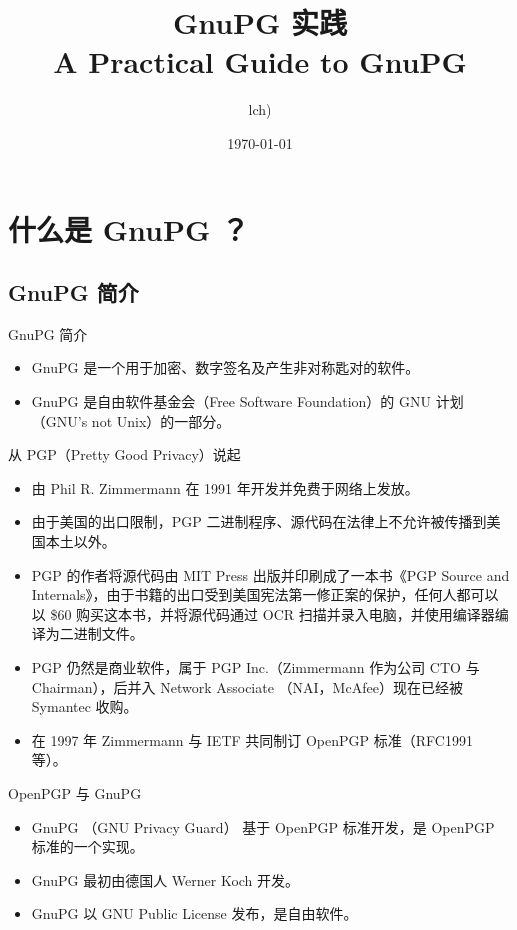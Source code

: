\documentclass{beamer}
\title{GnuPG 实践\\ A Practical Guide to GnuPG}
\author{lch)}
\date{\today}
\institute[LZUOSS]{
	\href{mailto:lchopn@gmail.com}{\textit{lchopn@gmail.com}}
}
\begin{document}
	\maketitle
	\section{什么是 GnuPG ？}
		\subsection{GnuPG 简介}
			\begin{frame}{GnuPG 简介}
				\begin{itemize}
					\item GnuPG 是一个用于加密、数字签名及产生非对称匙对的软件。
					\item GnuPG 是自由软件基金会（Free Software Foundation）的 GNU 计划 （GNU's not Unix）的一部分。
				\end{itemize}
			\end{frame}
			\begin{frame}{从 PGP（Pretty Good Privacy）说起}
			\begin{itemize}[<+->]
				\item 由 Phil R. Zimmermann 在 1991 年开发并免费于网络上发放。
				\item 由于美国的出口限制，PGP 二进制程序、源代码在法律上不允许被传播到美国本土以外。
				\item PGP 的作者将源代码由 MIT Press 出版并印刷成了一本书《PGP Source and Internals》，由于书籍的出口受到美国宪法第一修正案的保护，任何人都可以以 \$60 购买这本书，并将源代码通过 OCR 扫描并录入电脑，并使用编译器编译为二进制文件。
				\item PGP 仍然是商业软件，属于 PGP Inc.（Zimmermann 作为公司 CTO 与 Chairman），后并入 Network Associate （NAI，McAfee）现在已经被 Symantec 收购。
				\item 在 1997 年 Zimmermann 与 IETF 共同制订 OpenPGP 标准（RFC1991 等）。
			\end{itemize}
			\end{frame}
			\begin{frame}{OpenPGP 与 GnuPG}
				\begin{itemize}
					\item GnuPG （GNU Privacy Guard） 基于 OpenPGP 标准开发，是 OpenPGP 标准的一个实现。
					\item GnuPG 最初由德国人 Werner Koch 开发。
					\item GnuPG 以 GNU Public License 发布，是自由软件。
				\end{itemize}
			\end{frame}
\end{document}
